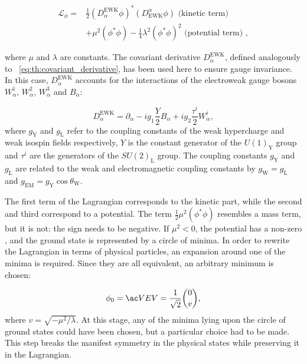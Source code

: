 \begin{equation}
\label{eq:th:higgs_lagrangian}
\begin{split}
\mathcal{L}_{\phi} = & \frac{1}{2}(D^{\textrm{EWK}}_{\alpha} \phi)^{*} (D^{\alpha}_{\textrm{EWK}} \phi) \text{ (kinetic term) }\\
 & + \mu^{2} (\phi^{*} \phi) - \frac{1}{4} \lambda^{2} (\phi^{*} \phi) ^{2}  \text{ (potential term) },
\end{split}
\end{equation}

where $\mu$ and $\lambda$ are constants. The covariant derivative $D^{{\textrm{EWK}}}_{\alpha}$, defined analogously to \Eq~\ref{eq:th:covariant_derivative}, has been used here to ensure gauge invariance. In this case, $D^{{\textrm{EWK}}}_{\alpha}$ accounts for the interactions of the electroweak gauge bosons $W^{1}_{\alpha}$, $W^{2}_{\alpha}$, $W^{3}_{\alpha}$ and $B_{\alpha}$:

\begin{equation}
\label{eq:th:full_covariant_derivative}
D^{{\textrm{EWK}}}_{\alpha} = \partial_{\alpha} -i g_{1} \frac{Y}{2} B_{\alpha} + i g_{2} \frac{\tau^{i}}{2} W^{i}_{\alpha},
\end{equation}
where $g_{\textrm{Y}}$ and $g_{\textrm{L}}$ refer to the coupling constants of the weak hypercharge and weak isospin fields respectively, $Y$ is the constant generator of the $U(1)_{\textrm{Y}}$ group and $\tau^{i}$ are the generators of the $SU(2)_{\textrm{L}}$ group. The coupling constants $g_{\textrm{Y}}$ and $g_{\textrm{L}}$ are related to the weak and electromagnetic coupling constants by $g_{\textrm{W}}=g_{\textrm{L}}$ and $g_{\textrm{EM}}= g_{\textrm{Y}} \cos \theta_{\textrm{W}}$. 

The first term of the Lagrangian corresponds to the kinetic part, while the second and third correspond to a potential. %
The term $ \frac{1}{2} \mu^{2} (\phi^{*} \phi)$ resembles a mass term, but it is not: the sign needs to be negative. If $\mu^{2}<0$, the potential has a non-zero \VEV, and the ground state is represented by a circle of minima. In order to rewrite the Lagrangian in terms of physical particles, an expansion around one of the minima is required. Since they are all equivalent, an arbitrary minimum is chosen:

\begin{equation}
\label{eq:th:higgs_vev}
\phi_{0} = \VEV = \frac{1}{\sqrt{2}} \binom{0}{v} ,
\end{equation}
where $v=\sqrt{- \mu^{2} / \lambda}$. At this stage, any of the minima lying upon the circle of ground states could have been chosen, but a particular choice had to be made. This step breaks the manifest symmetry in the physical states while preserving it in the Lagrangian. 

